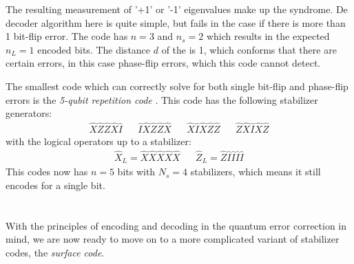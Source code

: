 The resulting measurement of '+1' or '-1' eigenvalues make up the syndrome. De decoder algorithm here is quite simple, but fails in the case if there is more than 1 bit-flip error. The code has $n=3$ and $n_s=2$ which results in the expected $n_L = 1$ encoded bits. The distance $d$ of the is 1, which conforms that there are certain errors, in this case phase-flip errors, which this code cannot detect.

The smallest code which can correctly solve for both single bit-flip and phase-flip errors is the \emph{5-qubit repetition code} \cite{laflamme1996perfect}. This code has the following stabilizer generators:
\begin{align}
  \hat{X}\hat{Z}\hat{Z}\hat{X}\hat{I} && \hat{I}\hat{X}\hat{Z}\hat{Z}\hat{X} && \hat{X}\hat{I}\hat{X}\hat{Z}\hat{Z} && \hat{Z}\hat{X}\hat{I}\hat{X}\hat{Z}
\end{align}
with the logical operators up to a stabilizer:
\begin{align}
  & \hat{X}_L = \hat{X}\hat{X}\hat{X}\hat{X}\hat{X} && \hat{Z}_L = \hat{Z}\hat{I}\hat{I}\hat{I}\hat{I} &
\end{align}
This codes now has $n=5$ bits with $N_s = 4$ stabilizers, which means it still encodes for a single bit.\\
\\
\\
With the principles of encoding and decoding in the quantum error correction in mind, we are now ready to move on to a more complicated variant of stabilizer codes, the \emph{surface code}. 


